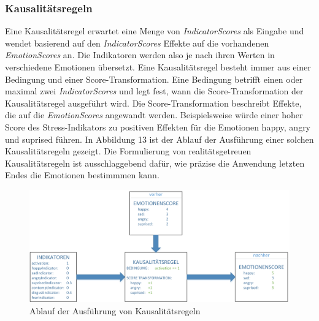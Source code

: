 \subsubsection{Kausalitätsregeln}
Eine Kausalitätsregel erwartet eine Menge von \textit{IndicatorScores} als Eingabe und wendet basierend auf den \textit{IndicatorScores} Effekte auf die vorhandenen \textit{EmotionScores} an. Die Indikatoren werden also je nach ihren Werten in verschiedene Emotionen übersetzt. \newline Eine Kausalitätsregel besteht immer aus einer Bedingung und einer Score-Transformation. Eine Bedingung betrifft einen oder maximal zwei \textit{IndicatorScores} und legt fest, wann die Score-Transformation der Kausalitätsregel ausgeführt wird. Die Score-Transformation beschreibt Effekte, die auf die \textit{EmotionScores} angewandt werden. Beispielsweise würde einer hoher Score des Stress-Indikators zu positiven Effekten für die Emotionen happy, angry und suprised führen. In Abbildung 13 ist der Ablauf der Ausführung einer solchen Kausalitätsregeln gezeigt. Die Formulierung von realitätsgetreuen Kausalitätsregeln ist ausschlaggebend dafür, wie präzise die Anwendung letzten Endes die Emotionen bestimmmen kann. \newline
\begin{figure}[h]
	\centering
	\includegraphics[width=16cm]{Bilder/causalityrules.png}
	\caption[Ablauf der Ausführung von Kausalitätsregeln]{Ablauf der Ausführung von Kausalitätsregeln}
\end{figure}%
\newline \newline \newline \newline
